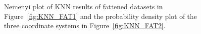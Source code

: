 \documentclass[11pt]{article}
\begin{document}
\begin{figure}[!h]
	\centering
	\caption{Nemenyi plot of KNN results of fattened datasets in Figure~\ref{fig:KNN_FAT1} and the probability density plot of the three coordinate systems in Figure~\ref{fig:KNN_FAT2}. }
	\label{fig:KNN_FAT}
\end{figure}
\end{document}
